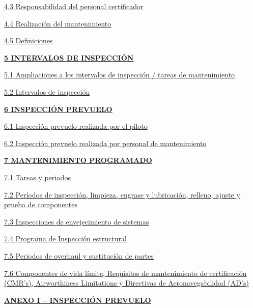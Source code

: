 \documentclass[
]{article}
\begin{document}
\protect\hyperlink{responsabilidad-del-personal-certificador}{4.3
Responsabilidad del personal certificador}

\protect\hyperlink{realizaciuxf3n-del-mantenimiento}{4.4 Realización del
mantenimiento}

\protect\hyperlink{definiciones}{4.5 Definiciones}

\protect\hyperlink{intervalos-de-inspecciuxf3n}{\textbf{5 INTERVALOS DE
INSPECCIÓN}}

\protect\hyperlink{ampliaciones-a-los-intervalos-de-inspecciuxf3n-tareas-de-mantenimiento}{5.1
Ampliaciones a los intervalos de inspección / tareas de mantenimiento}

\protect\hyperlink{_Toc408910598}{5.2 Intervalos de inspección}

\protect\hyperlink{inspecciuxf3n-prevuelo}{\textbf{6 INSPECCIÓN PREVUELO}}

\protect\hyperlink{inspecciuxf3n-prevuelo-realizada-por-el-piloto}{6.1
Inspección prevuelo realizada por el piloto}

\protect\hyperlink{inspecciuxf3n-prevuelo-realizada-por-personal-de-mantenimiento}{6.2
Inspección prevuelo realizada por personal de mantenimiento}

\protect\hyperlink{mantenimiento-programado}{\textbf{7 MANTENIMIENTO PROGRAMADO}}

\protect\hyperlink{tareas-y-periodos}{7.1 Tareas y periodos}

\protect\hyperlink{peruxedodos-de-inspecciuxf3n-limpieza-engrase-y-lubricaciuxf3n-relleno-ajuste-y-prueba-de-componentes}{7.2
Períodos de inspección, limpieza, engrase y lubricación, relleno, ajuste
y prueba de componentes}

\protect\hyperlink{inspecciones-de-envejecimiento-de-sistemas}{7.3
Inspecciones de envejecimiento de sistemas}

\protect\hyperlink{programa-de-inspecciuxf3n-estructural}{7.4 Programa
de Inspección estructural}

\protect\hyperlink{periodos-de-overhaul-y-sustituciuxf3n-de-partes}{7.5
Periodos de overhaul y sustitución de partes}

\protect\hyperlink{componentes-de-vida-luxedmite-requisitos-de-mantenimiento-de-certificaciuxf3n-cmrs-airworthiness-limitations-y-directivas-de-aeronavegabilidad-ads}{7.6
Componentes de vida límite, Requisitos de mantenimiento de certificación
(CMR's), Airworthiness Limitations y Directivas de Aeronavegabilidad
(AD's)}

\protect\hyperlink{_Toc408910609}{\textbf{ANEXO I -- INSPECCIÓN PREVUELO}}
\end{document}
